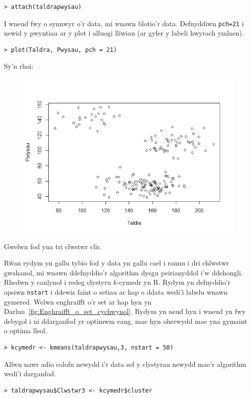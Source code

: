 \begin{verbatim}
> attach(taldrapwysau)
\end{verbatim}

I wneud fwy o synnwyr o'r data, mi wnawn blotio'r data. Defnyddiwn \texttt{pch=21} i newid y pwyntiau ar y plot i alluogi lliwiau (ar gyfer y labeli hwyrach ymlaen).

\begin{verbatim}
> plot(Taldra, Pwysau, pch = 21)
\end{verbatim}

Sy'n rhoi:

\begin{figure}[H]
\begin{center}
\includegraphics[width=0.5\linewidth]{../img/ScatterplotR.jpeg}
\end{center}
\label{fig:ScatterplotR}
\end{figure}

Gwelwn fod yna tri clwstwr clir. 

R\^{w}an rydym yn gallu tybio fod y data yn gallu cael i rannu i dri chlwstwr gwahanol, mi wnawn ddefnyddio'r algorithm dysgu peirianyddol i'w ddehongli. Rhedwn y canlynol i redeg clystyru $k$-cymedr yn R. Rydym yn defnyddio'r opsiwn \texttt{nstart} i ddewis faint o setiau ar hap o ddata wedi'i labelu wnawn gymered. Welwn enghraifft o'r set ar hap hyn yn Darlun~\ref{fig:Enghraifft_o_set_cychwynol}. Rydym yn neud hyn i wneud yn fwy debygol i ni ddarganfod yr optimwm eang, mae hyn oherwydd mae yna gymaint o optima lleol.

\begin{verbatim}
> kcymedr <- kmeans(taldrapwysau,3, nstart = 50)
\end{verbatim}

Allwn nawr adio colofn newydd i'r data sef y clystyrau newydd mae'r algorithm wedi'i darganfod.

\begin{verbatim}
> taldrapwysau$Clwstwr3 <- kcymedr$cluster
\end{verbatim}

